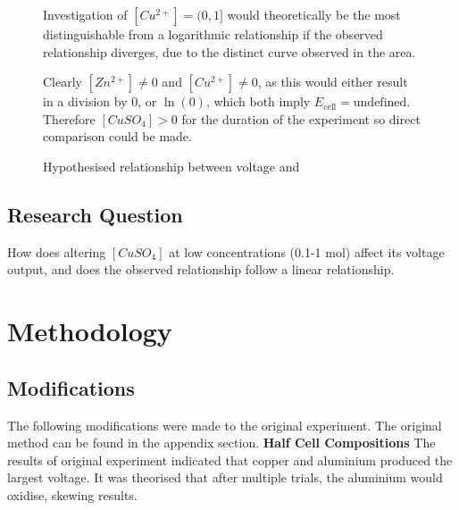 \documentclass[11pt,a4paper]{article}
\begin{document}
\begin{figure}[h]
	\centering
\begin{minipage}{0.5\textwidth}
	
	
\caption{Hypothesised relationship between voltage and }	
\end{minipage}%
\begin{minipage}{0.5\textwidth}
Investigation of $[Cu^{2+}]=(0, 1]$ would theoretically be the most distinguishable from a logarithmic relationship if the observed relationship diverges, due to the distinct curve observed in the area.

Clearly $[Zn^{2+}]\neq 0$ and $[Cu^{2+}]\neq 0$, as this would either result in a division by 0, or $\ln(0)$, which both imply $E_\textrm{cell}=\textrm{undefined}$. Therefore $[CuSO_4]>0$ for the duration of the experiment so direct comparison could be made.
\end{minipage}
\end{figure}





\subsection{Research Question}
How does altering $[CuSO_4]$ at low concentrations (0.1-1 mol) affect its voltage output, and does the observed relationship follow a linear relationship.
\section{Methodology}
\subsection{Modifications}

The following modifications were made to the original experiment. The original method can be found in the appendix section.\newline
\textbf{Half Cell Compositions}\newline
The results of original experiment indicated that copper and aluminium produced the largest voltage. It was theorised that after multiple trials, the aluminium would oxidise, skewing results.
\end{document}
